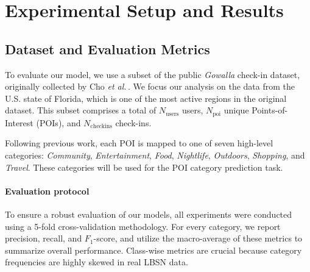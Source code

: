 
\section{Experimental Setup and Results}
\label{sec:experiments}

\subsection{Dataset and Evaluation Metrics}
\label{sec:method:single_task_heads}

To evaluate our model, we use a subset of the public \emph{Gowalla} check-in dataset, originally collected by Cho \textit{et al.}\,\cite{Cho2011}. We focus our analysis on the data from the U.S. state of Florida, which is one of the most active regions in the original dataset. This subset comprises a total of {$N_\text{users}$} users, {$N_\text{poi}$} unique Points-of-Interest (POIs), and {$N_\text{checkins}$} check-ins.

Following previous work, each POI is mapped to one of seven high-level categories: \emph{Community}, \emph{Entertainment}, \emph{Food}, \emph{Nightlife}, \emph{Outdoors}, \emph{Shopping}, and \emph{Travel}. These categories will be used for the POI category prediction task.

\paragraph*{Evaluation protocol}
To ensure a robust evaluation of our models, all experiments were conducted using a 5-fold cross-validation methodology. For every category, we report precision, recall, and $F_{1}$-score, and utilize the macro-average of these metrics to summarize overall performance. Class-wise metrics are crucial because category frequencies are highly skewed in real LBSN data.


